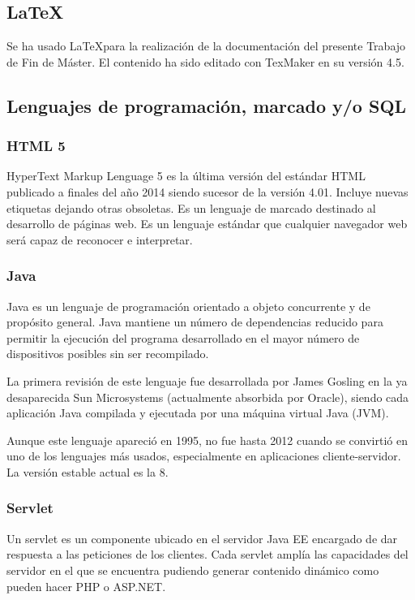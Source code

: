 \subsection{\LaTeX}
Se ha usado \LaTeX  para la realización de la documentación del presente Trabajo de Fin de Máster. El contenido ha sido editado con TexMaker en su versión 4.5.

\subsection{Lenguajes de programación, marcado y/o SQL}

\subsubsection{HTML 5}
HyperText Markup Lenguage 5 es la última versión del estándar HTML publicado a finales del año 2014 siendo sucesor de la versión 4.01. Incluye nuevas etiquetas dejando otras obsoletas. Es un lenguaje de marcado destinado al desarrollo de páginas web. Es un lenguaje estándar que cualquier navegador web será capaz de reconocer e interpretar.

\subsubsection{Java}
Java es un lenguaje de programación orientado a objeto concurrente y de propósito general. Java mantiene un número de dependencias reducido para permitir la ejecución del programa desarrollado en el mayor número de dispositivos posibles sin ser recompilado.

La primera revisión de este lenguaje fue desarrollada por James Gosling en la ya desaparecida Sun Microsystems (actualmente absorbida por Oracle), siendo cada aplicación Java compilada y ejecutada por una máquina virtual Java (JVM).

Aunque este lenguaje apareció en 1995, no fue hasta 2012 cuando se convirtió en uno de los lenguajes más usados, especialmente en aplicaciones cliente-servidor. La versión estable actual es la 8.

\subsubsection{Servlet}

Un servlet \cite{servlet:wiki} es un componente ubicado en el servidor Java EE encargado de dar respuesta a las peticiones de los clientes. Cada servlet amplía las capacidades del servidor en el que se encuentra pudiendo generar contenido dinámico como pueden hacer PHP o ASP.NET.


